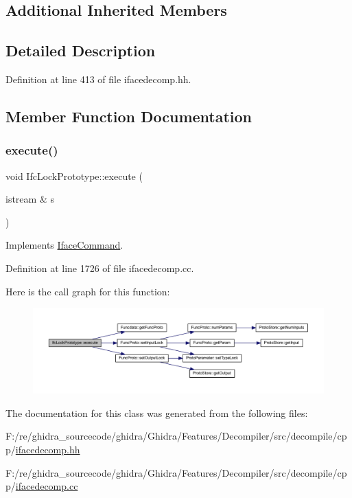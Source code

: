 \subsection*{Additional Inherited Members}


\subsection{Detailed Description}


Definition at line 413 of file ifacedecomp.\+hh.



\subsection{Member Function Documentation}
\mbox{\label{class_ifc_lock_prototype_aa2e82ff8df04101dcee268fca0f0f1b4}} 
\subsubsection{\texorpdfstring{execute()}{execute()}}
{\footnotesize\ttfamily void Ifc\+Lock\+Prototype\+::execute (\begin{DoxyParamCaption}\item[{istream \&}]{s }\end{DoxyParamCaption})\hspace{0.3cm}{\ttfamily [virtual]}}



Implements \mbox{\hyperlink{class_iface_command_af10e29cee2c8e419de6efe9e680ad201}{Iface\+Command}}.



Definition at line 1726 of file ifacedecomp.\+cc.

Here is the call graph for this function\+:
\nopagebreak
\begin{figure}[H]
\begin{center}
\leavevmode
\includegraphics[width=350pt]{class_ifc_lock_prototype_aa2e82ff8df04101dcee268fca0f0f1b4_cgraph}
\end{center}
\end{figure}


The documentation for this class was generated from the following files\+:\begin{DoxyCompactItemize}
\item 
F\+:/re/ghidra\+\_\+sourcecode/ghidra/\+Ghidra/\+Features/\+Decompiler/src/decompile/cpp/\mbox{\hyperlink{ifacedecomp_8hh}{ifacedecomp.\+hh}}\item 
F\+:/re/ghidra\+\_\+sourcecode/ghidra/\+Ghidra/\+Features/\+Decompiler/src/decompile/cpp/\mbox{\hyperlink{ifacedecomp_8cc}{ifacedecomp.\+cc}}\end{DoxyCompactItemize}
